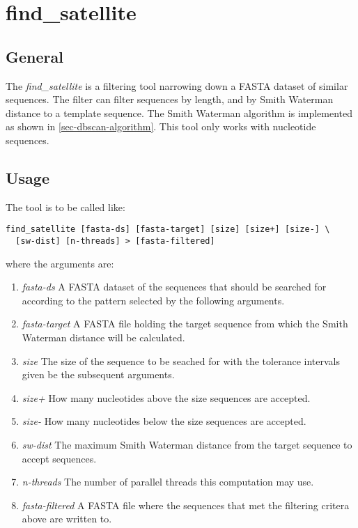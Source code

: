 \section{find\_satellite}

\subsection{General}

The \emph{find\_satellite} is a filtering tool narrowing down a FASTA
dataset of similar sequences. The filter can filter sequences by
length, and by Smith Waterman distance to a template sequence. The
Smith Waterman algorithm is implemented as shown in
\ref{sec-dbscan-algorithm}. This tool only works with nucleotide
sequences. 

\subsection{Usage}
The tool is to be called like:
\begin{lstlisting}
find_satellite [fasta-ds] [fasta-target] [size] [size+] [size-] \
  [sw-dist] [n-threads] > [fasta-filtered]
\end{lstlisting}
where the arguments are:
\begin{enumerate}
  \item \emph{fasta-ds} A FASTA dataset of the sequences that should be searched
    for according to the pattern selected by the following arguments.
  \item \emph{fasta-target} A FASTA file holding the target sequence
    from which the Smith Waterman distance will be calculated.
  \item \emph{size} The size of the sequence to be seached for with
    the tolerance intervals given be the subsequent arguments.
  \item \emph{size+} How many nucleotides above the size sequences are
    accepted.
  \item \emph{size-} How many nucleotides below the size sequences are
    accepted.
  \item \emph{sw-dist} The maximum Smith Waterman distance from the
    target sequence to accept sequences.
  \item \emph{n-threads} The number of parallel threads this
    computation may use.
  \item \emph{fasta-filtered} A FASTA file where the sequences that
    met the filtering critera above are written to. 
\end{enumerate}

